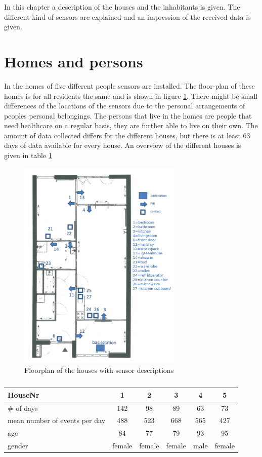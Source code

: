 In this chapter a description of the houses and the inhabitants is given. The different kind of sensors are explained and an impression of the received data is given.

\section{Homes and persons}
In the homes of five different people sensors are installed. The floor-plan of these homes is for all residents the same and is shown in figure \ref{fig:floorplan}. There might be small differences of the locations of the sensors due to the personal arrangements of peoples personal belongings.
The persons that live in the homes are people that need healthcare on a regular basis, they are further able to live on their own. The amount of data collected differs for the different houses, but there is at least 63 days of data available for every house. An overview of the different houses is given in table \ref{table:houses}

\begin{figure}
\centering
 \includegraphics[width=0.7\textwidth]{Pictures/floorplan.png}
 \caption{Floorplan of the houses with sensor descriptions}
 \label{fig:floorplan}
\end{figure}


\begin{table}[h]
\caption{ }
\centering
\begin{tabular}{lccccc}
\centering
HouseNr & 1 & 2 & 3 & 4 & 5 \\
\hline
\# of days & 142 & 98 & 89 & 63 & 73 \\
mean number of events per day & 488 & 523 & 668 & 565 & 427 \\
age & 84 & 77 & 79 & 93 & 95\\
gender & female & female & female & male & female
\end{tabular}
\label{table:houses}
\end{table}




